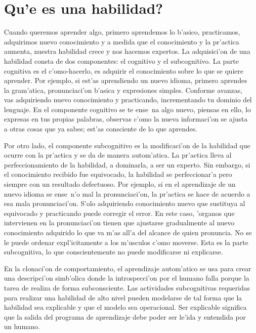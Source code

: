 \documentclass[11pt]{article}
\begin{document}
\section{\textquestiondown Qu'e es una habilidad?} 

Cuando queremos aprender algo, primero aprendemos lo b'asico, practicamos, adquirimos nuevo conocimiento y a medida que el conocimiento y la pr'actica aumenta, nuestra habilidad crece y nos hacemos expertos. La adquisici'on de una habilidad consta de dos componentes: el cognitivo y el subcognitivo. La parte cognitiva es el c'omo-hacerlo, es adquirir el conocimiento sobre lo que se quiere aprender. Por ejemplo, si est'as aprendiendo un nuevo idioma, primero aprendes la gram'atica, pronunciaci'on b'asica y expresiones simples. Conforme avanzas, vas adquiriendo nuevo conocimiento y practicando, incrementando tu dominio del lenguaje. En el componente cognitivo se te ense~na algo nuevo, piensas en ello, lo expresas en tus propias palabras, observas c'omo la nueva informaci'on se ajusta a otras cosas que ya sabes; est'as consciente de lo que aprendes.

\medskip
Por otro lado, el componente subcognitivo es la modificaci'on de la habilidad que ocurre con la pr'actica y se da de manera autom'atica. La pr'actica lleva al perfeccionamiento de la habilidad, a dominarla, a ser un experto. Sin embargo, si el conocimiento recibido fue equivocado, la habilidad se perfeccionar'a pero siempre con un resultado defectuoso. Por ejemplo, si en el aprendizaje de un nuevo idioma se ense~n'o mal la pronunciaci'on, la pr'actica se hace de acuerdo a esa mala pronunciaci'on. S'olo adquiriendo conocimiento nuevo que sustituya al equivocado y practicando puede corregir el error. En este caso, 'organos que intervienen en la pronunciaci'on tienen que ajustarse gradualmente al nuevo conocimiento adquirido lo que va m'as all'a del alcance de quien pronuncia. No se le puede ordenar expl'icitamente a los m'usculos c'omo moverse. Esta es la parte subcognitiva, lo que conscientemente no puede modificarse ni explicarse.

\medskip
En la clonaci'on de comportamiento, el aprendizaje autom'atico se usa para crear una descripci'on simb'olica donde la introspecci'on por el humano falla porque la tarea de realiza de forma subconsciente. Las actividades subcognitivas requeridas para realizar una habilidad de alto nivel pueden modelarse de tal forma que la habilidad sea explicable y que el modelo sea operacional. Ser explicable significa que la salida del programa de aprendizaje debe poder ser le'ida y entendida por un humano.
\end{document}
